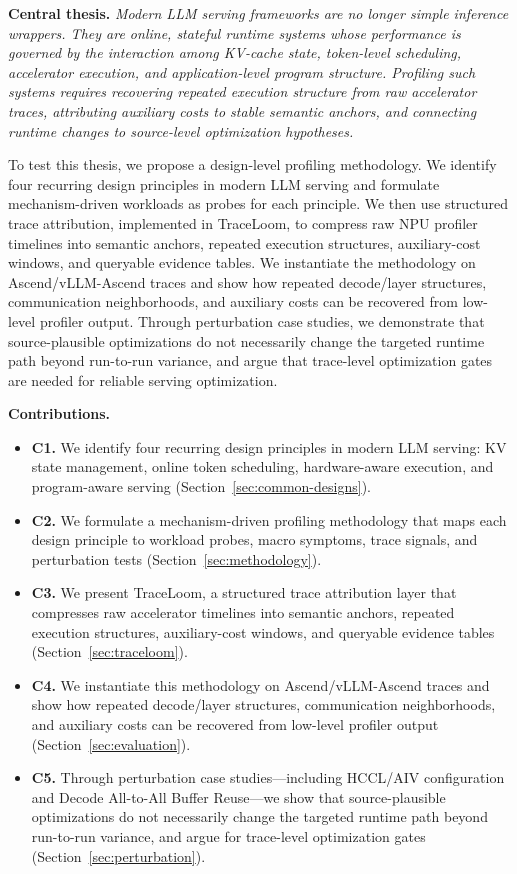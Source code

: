 \documentclass[conference]{IEEEtran}
\begin{document}
\textbf{Central thesis.}
\emph{Modern LLM serving frameworks are no longer simple inference wrappers.
They are online, stateful runtime systems whose performance is governed by the
interaction among KV-cache state, token-level scheduling, accelerator
execution, and application-level program structure. Profiling such systems
requires recovering repeated execution structure from raw accelerator traces,
attributing auxiliary costs to stable semantic anchors, and connecting runtime
changes to source-level optimization hypotheses.}

To test this thesis, we propose a design-level profiling methodology. We
identify four recurring design principles in modern LLM serving and formulate
mechanism-driven workloads as probes for each principle. We then use structured
trace attribution, implemented in TraceLoom, to compress raw NPU profiler
timelines into semantic anchors, repeated execution structures, auxiliary-cost
windows, and queryable evidence tables. We instantiate the methodology on
Ascend/vLLM-Ascend traces and show how repeated decode/layer structures,
communication neighborhoods, and auxiliary costs can be recovered from
low-level profiler output. Through perturbation case studies, we demonstrate
that source-plausible optimizations do not necessarily change the targeted
runtime path beyond run-to-run variance, and argue that trace-level
optimization gates are needed for reliable serving optimization.

\textbf{Contributions.}
\begin{itemize}
\item \textbf{C1.} We identify four recurring design principles in modern LLM
serving: KV state management, online token scheduling, hardware-aware execution,
and program-aware serving (Section~\ref{sec:common-designs}).

\item \textbf{C2.} We formulate a mechanism-driven profiling methodology that
maps each design principle to workload probes, macro symptoms, trace signals,
and perturbation tests (Section~\ref{sec:methodology}).

\item \textbf{C3.} We present TraceLoom, a structured trace attribution layer
that compresses raw accelerator timelines into semantic anchors, repeated
execution structures, auxiliary-cost windows, and queryable evidence tables
(Section~\ref{sec:traceloom}).

\item \textbf{C4.} We instantiate this methodology on Ascend/vLLM-Ascend
traces and show how repeated decode/layer structures, communication
neighborhoods, and auxiliary costs can be recovered from low-level profiler
output (Section~\ref{sec:evaluation}).

\item \textbf{C5.} Through perturbation case studies---including HCCL/AIV
configuration and Decode All-to-All Buffer Reuse---we show that source-plausible
optimizations do not necessarily change the targeted runtime path beyond
run-to-run variance, and argue for trace-level optimization gates
(Section~\ref{sec:perturbation}).
\end{itemize}
\end{document}
